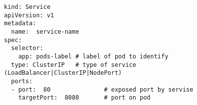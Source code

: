 \begin{lstfloat}
\begin{lstlisting}[style=mybashstyle,
caption={Ukázka reprezentace objektu SERVICE},
label={fig:def_service},
label={sample:service}
]
kind: Service
apiVersion: v1
metadata:
  name:  service-name
spec:
  selector:
    app: pods-label # label of pod to identify 
  type: ClusterIP   # type of service (LoadBalancer|ClusterIP|NodePort)
  ports:
  - port:  80               # exposed port by servise
    targetPort:  8080       # port on pod
\end{lstlisting}
\end{lstfloat}